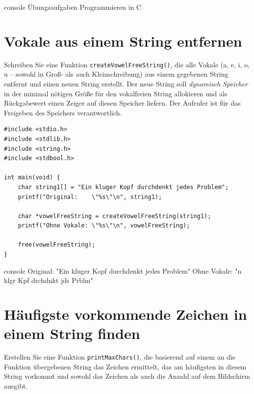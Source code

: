 \begin{mybox}[Bildschirmausgabe]{console}
Übungsaufgaben Programmieren in C
\end{mybox}





\chapter{Vokale aus einem String entfernen}

\vspace{10pt}

Schreiben Sie eine Funktion \texttt{createVowelFreeString()}, die alle
Vokale (a, e, i, o, u -- sowohl in Groß- als auch Kleinschreibung) aus einem
gegebenen String entfernt und einen neuen String erstellt. Der neue String soll
\textit{dynamisch Speicher} in der minimal nötigen Größe für den vokalfreien
String allokieren und als Rückgabewert einen Zeiger auf diesen Speicher liefern.
Der Aufrufer ist für das Freigeben des Speichers verantwortlich.

\Vorlage
\begin{verbatim}
#include <stdio.h>
#include <stdlib.h>
#include <string.h>
#include <stdbool.h>

int main(void) {
    char string1[] = "Ein kluger Kopf durchdenkt jedes Problem";
    printf("Original:    \"%s\"\n", string1);

    char *vowelFreeString = createVowelFreeString(string1);
    printf("Ohne Vokale: \"%s\"\n", vowelFreeString);

    free(vowelFreeString);
}
\end{verbatim}

\begin{mybox}[Bildschirmausgabe]{console}
Original:    "Ein kluger Kopf durchdenkt jedes Problem"
Ohne Vokale: "n klgr Kpf drchdnkt jds Prblm"
\end{mybox}





\chapter{Häufigste vorkommende Zeichen in einem String finden}

\vspace{10pt}

Erstellen Sie eine Funktion \texttt{printMaxChars()}, die basierend auf
einem an die Funktion übergebenen String das Zeichen ermittelt, das am
häufigsten in diesem String vorkommt und sowohl das Zeichen als auch die Anzahl
auf dem Bildschirm ausgibt.

